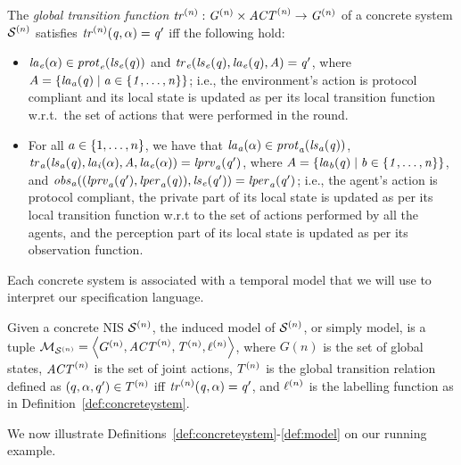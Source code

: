 \begin{definition} 
  \label{def:globaltransition}
  The {\em global transition function} $\it{tr}^{(n)} : G^{(n)}
  \times \it{ACT}^{(n)} \rightarrow G^{(n)}$ of a concrete system $\mathcal{S}^{(n)}$
  satisfies $\it{tr}^{(n)}(q, \alpha) = q'$ iff the following hold:
  \begin{itemize}
  \item $\it{la}_{e}({\alpha}) \in \it{prot}_{e}({\it{ls}_{e}(q)})$ and
    $\it{tr}_{e}(\it{ls}_{e}(q), \it{la}_{e}({q}), A) = q'$, where
    $A = \left \{ \it{la}_{a}({q}) \mid a \in \left \{ 1,\ldots,n \right \} \right \}$; i.e., the environment’s
    action is protocol compliant and its local state is updated as per its
    local transition function w.r.t.\ the set of actions that were performed in
    the round.

  \item For all $a \in \left \{ 1,\ldots,n \right \}$, we have that
    $\it{la}_{a}({\alpha}) \in \it{prot}_{a}(\it{ls}_{a}(q))$,
    $\it{tr}_{a} (\it{ls}_{a}(q), \it{la}_{i}({\alpha}), A, \it{la}_{e}({\alpha})) = \it{lprv}_{a}(q')$,
    where $A = \left \{ \it{la}_{b}({q}) \mid b \in \left \{ 1,\ldots,n \right \} \right \}$, and
    $\it{obs}_{a}((\it{lprv}_{a}(q'),\it{lper}_{a}(q)),\it{ls}_{e}(q')) = \it{lper}_{a}(q')$; i.e., the
    agent's action is protocol compliant, the private part of its local state
    is updated as per its local transition function w.r.t to the set of actions
    performed by all the agents, and the perception part of its local state is
    updated as per its observation function.
  \end{itemize}
\end{definition}


Each concrete system is associated with a temporal model 
that we will use  to interpret our specification language.

\begin{definition}[Model]
  \label{def:model}
  Given a concrete NIS $\mathcal{S}^{(n)}$, the induced model of $\mathcal{S}^{(n)}$, or simply model,
  is a tuple $\mathcal{M}_{\mathcal{S}^{(n)}} = \left \langle G^{(n)}, \it{ACT}^{(n)}, T^{(n)},
  \ell^{(n)} \right \rangle$, where $G(n)$ is the set of global states, $\it{ACT}^{(n)}$ is the
  set of joint actions, $T^{(n)}$ is the global transition relation defined
  as $(q, \alpha, q') \in T^{(n)}$ iff $\it{tr}^{(n)}(q, \alpha) = q'$, and 
  $\ell^{(n)}$ is the labelling function as in
  Definition~\ref{def:concreteystem}.
\end{definition}

We now illustrate Definitions~\ref{def:concreteystem}-\ref{def:model} on our running
example.

